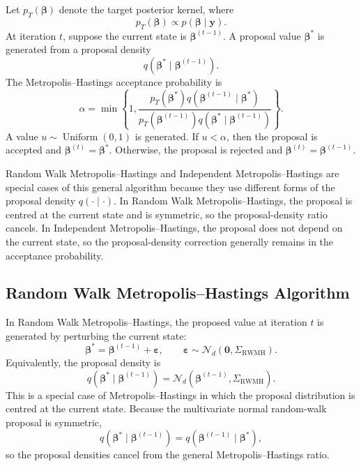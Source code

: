Let $p_T(\boldsymbol{\beta})$ denote the target posterior kernel, where
\[
p_T(\boldsymbol{\beta})
\propto
p(\boldsymbol{\beta}\mid \mathbf{y}).
\]
At iteration $t$, suppose the current state is $\boldsymbol{\beta}^{(t-1)}$. A proposal value $\boldsymbol{\beta}^{*}$ is generated from a proposal density
\[
q(\boldsymbol{\beta}^{*}\mid \boldsymbol{\beta}^{(t-1)}).
\]
The Metropolis--Hastings acceptance probability is
\[
\alpha
=
\min\left\{
1,
\frac{
  p_T(\boldsymbol{\beta}^{*})
q(\boldsymbol{\beta}^{(t-1)}\mid \boldsymbol{\beta}^{*})
}{
  p_T(\boldsymbol{\beta}^{(t-1)})
q(\boldsymbol{\beta}^{*}\mid \boldsymbol{\beta}^{(t-1)})
}
\right\}.
\]
A value $u\sim\operatorname{Uniform}(0,1)$ is generated. If $u<\alpha$, then the proposal is accepted and $\boldsymbol{\beta}^{(t)}=\boldsymbol{\beta}^{*}$. Otherwise, the proposal is rejected and $\boldsymbol{\beta}^{(t)}=\boldsymbol{\beta}^{(t-1)}$.

Random Walk Metropolis--Hastings and Independent Metropolis--Hastings are special cases of this general algorithm because they use different forms of the proposal density $q(\cdot\mid\cdot)$. In Random Walk Metropolis--Hastings, the proposal is centred at the current state and is symmetric, so the proposal-density ratio cancels. In Independent Metropolis--Hastings, the proposal does not depend on the current state, so the proposal-density correction generally remains in the acceptance probability.

\subsection{Random Walk Metropolis--Hastings Algorithm}

In Random Walk Metropolis--Hastings, the proposed value at iteration $t$ is generated by perturbing the current state:
\[
\boldsymbol{\beta}^{*}
=
\boldsymbol{\beta}^{(t-1)}+\boldsymbol{\varepsilon},
\qquad
\boldsymbol{\varepsilon}
\sim
\mathcal{N}_d(\mathbf{0},\Sigma_{\mathrm{RWMH}}).
\]
Equivalently, the proposal density is
\[
q(\boldsymbol{\beta}^{*}\mid \boldsymbol{\beta}^{(t-1)})
=
\mathcal{N}_d(\boldsymbol{\beta}^{(t-1)},\Sigma_{\mathrm{RWMH}}).
\]
This is a special case of Metropolis--Hastings in which the proposal distribution is centred at the current state. Because the multivariate normal random-walk proposal is symmetric,
\[
q(\boldsymbol{\beta}^{*}\mid \boldsymbol{\beta}^{(t-1)})
=
q(\boldsymbol{\beta}^{(t-1)}\mid \boldsymbol{\beta}^{*}),
\]
so the proposal densities cancel from the general Metropolis--Hastings ratio.

